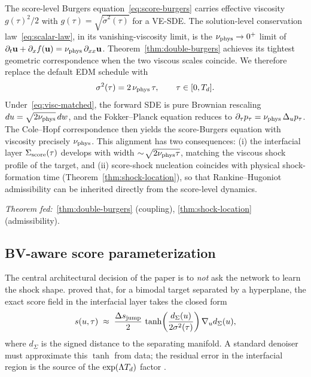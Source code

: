 The score-level Burgers equation~\eqref{eq:score-burgers} carries effective viscosity $g(\tau)^{2}/2$ with $g(\tau)=\sqrt{\dot\sigma^{2}(\tau)}$ for a {VE-SDE}. The solution-level conservation law~\eqref{eq:scalar-law}, in its vanishing-viscosity limit, is the $\nu_{\mathrm{phys}}\to0^{+}$ limit of $\partial_{t}\mathbf{u}+\partial_{x}f(\mathbf{u}) = \nu_{\mathrm{phys}}\,\partial_{xx}\mathbf{u}$. Theorem~\ref{thm:double-burgers} achieves its tightest geometric correspondence when the two viscous scales coincide. We therefore replace the default {EDM} schedule with
\begin{equation}
  \label{eq:visc-matched}
  \sigma^{2}(\tau) = 2\,\nu_{\mathrm{phys}}\,\tau, \qquad \tau\in[0,T_{d}].
\end{equation}
Under~\eqref{eq:visc-matched}, the forward {SDE} is pure Brownian rescaling $du=\sqrt{2\nu_{\mathrm{phys}}}\,dw$, and the {Fokker--Planck} equation reduces to $\partial_{\tau}p_{\tau}=\nu_{\mathrm{phys}}\,\Delta_{u}p_{\tau}$. The Cole--Hopf correspondence then yields the score-Burgers equation with viscosity precisely $\nu_{\mathrm{phys}}$. This alignment has two consequences: (i) the interfacial layer $\Sigma_{\mathrm{score}}(\tau)$ develops with width $\sim\!\sqrt{2\nu_{\mathrm{phys}}\tau}$, matching the viscous shock profile of the target, and (ii) score-shock nucleation coincides with physical shock-formation time (Theorem~\ref{thm:shock-location}), so that Rankine--Hugoniot admissibility can be inherited directly from the score-level dynamics.

\emph{Theorem fed:}~\ref{thm:double-burgers} (coupling), \ref{thm:shock-location} (admissibility).

\subsection{BV-aware score parameterization}
\label{sec:method:bv-aware}

The central architectural decision of the paper is to \emph{not} ask the network to learn the shock shape. \citet[Proposition~5.4]{sarkar2026scoreshocks} proved that, for a bimodal target separated by a hyperplane, the exact score field in the interfacial layer takes the closed form
\begin{equation}
  s(u,\tau) \;\approx\; \frac{\Delta s_{\mathrm{jump}}}{2}\,
    \tanh\!\left(\frac{d_{\Sigma}(u)}{2\sigma^{2}(\tau)}\right)
    \nabla_{u}d_{\Sigma}(u),
\end{equation}
where $d_{\Sigma}$ is the signed distance to the separating manifold. A standard denoiser must approximate this $\tanh$ from data; the residual error in the interfacial region is the source of the $\exp(\Lambda T_{d})$ factor \citep[Theorem~6.3]{sarkar2026scoreshocks}.

